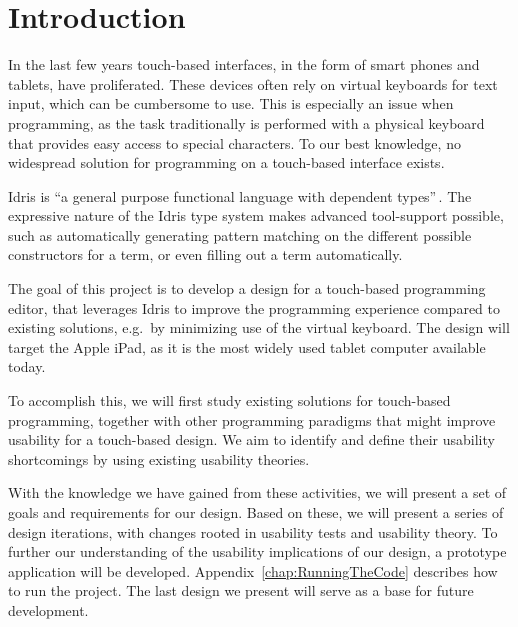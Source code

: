 \chapter{Introduction}
\label{sec:Introduction}
In the last few years touch-based interfaces, in the form of smart phones and tablets, have proliferated. These devices often rely on virtual keyboards for text input, which can be cumbersome to use.
This is especially an issue when programming, as the task traditionally is performed with a physical keyboard
that provides easy access to special characters.
To our best knowledge, no widespread solution for programming on a touch-based interface exists.

Idris is ``a general purpose functional language with dependent types''\,\cite{brady2013idris}. The expressive nature of the Idris type system makes advanced tool-support possible, such as automatically generating pattern matching on the different possible constructors for a term, or even filling out a term automatically.

The goal of this project is to develop a design for a touch-based programming editor, that leverages Idris to improve the programming experience compared to existing solutions, e.g.\ by minimizing use of the virtual keyboard.
The design will target the Apple iPad, as it is the most widely used tablet computer available today.

To accomplish this, we will first study existing solutions for touch-based programming, together with other programming paradigms that might improve usability for a touch-based design.
We aim to identify and define their usability shortcomings by using existing usability theories.

With the knowledge we have gained from these activities, we will present a set of goals and requirements for our design.
Based on these, we will present a series of design iterations, with changes rooted in usability tests and usability theory.
To further our understanding of the usability implications of our design, a prototype application will be developed.
Appendix~\ref{chap:RunningTheCode} describes how to run the project.
The last design we present will serve as a base for future development.

